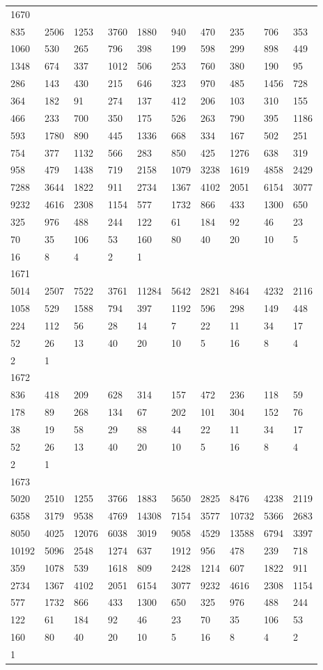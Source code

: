 \begin{longtable}{*{10}{l}}
1670&&&&&&&&&\\
835& 2506& 1253& 3760& 1880& 940& 470& 235& 706& 353\\
1060& 530& 265& 796& 398& 199& 598& 299& 898& 449\\
1348& 674& 337& 1012& 506& 253& 760& 380& 190& 95\\
286& 143& 430& 215& 646& 323& 970& 485& 1456& 728\\
364& 182& 91& 274& 137& 412& 206& 103& 310& 155\\
466& 233& 700& 350& 175& 526& 263& 790& 395& 1186\\
593& 1780& 890& 445& 1336& 668& 334& 167& 502& 251\\
754& 377& 1132& 566& 283& 850& 425& 1276& 638& 319\\
958& 479& 1438& 719& 2158& 1079& 3238& 1619& 4858& 2429\\
7288& 3644& 1822& 911& 2734& 1367& 4102& 2051& 6154& 3077\\
9232& 4616& 2308& 1154& 577& 1732& 866& 433& 1300& 650\\
325& 976& 488& 244& 122& 61& 184& 92& 46& 23\\
70& 35& 106& 53& 160& 80& 40& 20& 10& 5\\
16& 8& 4& 2& 1& \\

1671&&&&&&&&&\\
5014& 2507& 7522& 3761& 11284& 5642& 2821& 8464& 4232& 2116\\
1058& 529& 1588& 794& 397& 1192& 596& 298& 149& 448\\
224& 112& 56& 28& 14& 7& 22& 11& 34& 17\\
52& 26& 13& 40& 20& 10& 5& 16& 8& 4\\
2& 1& \\

1672&&&&&&&&&\\
836& 418& 209& 628& 314& 157& 472& 236& 118& 59\\
178& 89& 268& 134& 67& 202& 101& 304& 152& 76\\
38& 19& 58& 29& 88& 44& 22& 11& 34& 17\\
52& 26& 13& 40& 20& 10& 5& 16& 8& 4\\
2& 1& \\

1673&&&&&&&&&\\
5020& 2510& 1255& 3766& 1883& 5650& 2825& 8476& 4238& 2119\\
6358& 3179& 9538& 4769& 14308& 7154& 3577& 10732& 5366& 2683\\
8050& 4025& 12076& 6038& 3019& 9058& 4529& 13588& 6794& 3397\\
10192& 5096& 2548& 1274& 637& 1912& 956& 478& 239& 718\\
359& 1078& 539& 1618& 809& 2428& 1214& 607& 1822& 911\\
2734& 1367& 4102& 2051& 6154& 3077& 9232& 4616& 2308& 1154\\
577& 1732& 866& 433& 1300& 650& 325& 976& 488& 244\\
122& 61& 184& 92& 46& 23& 70& 35& 106& 53\\
160& 80& 40& 20& 10& 5& 16& 8& 4& 2\\
1& \\


\end{longtable}
